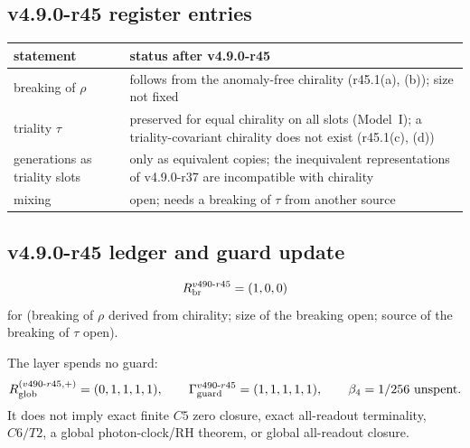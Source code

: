 \subsection*{v4.9.0-r45 register entries}
\label{subsec:v490-r45-register}

\begin{center}
\small
\begin{tabular}{@{}>{\raggedright\arraybackslash}p{}>{\raggedright\arraybackslash}p{}@{}}
\toprule
statement & status after v4.9.0-r45\\
\midrule
breaking of \(\rho\) & follows from the anomaly-free chirality (r45.1(a), (b)); size not fixed\\
triality \(\tau\) & preserved for equal chirality on all slots (Model~I); a triality-covariant chirality does not exist (r45.1(c), (d))\\
generations as triality slots & only as equivalent copies; the inequivalent representations of v4.9.0-r37 are incompatible with chirality\\
mixing & open; needs a breaking of \(\tau\) from another source\\
\bottomrule
\end{tabular}
\end{center}

\subsection*{v4.9.0-r45 ledger and guard update}
\label{subsec:v490-r45-ledger-guard}

\[
R_{\rm br}^{v490\text{-}r45}=(1,0,0)
\]
for (breaking of \(\rho\) derived from chirality; size of the breaking open; source of the breaking of \(\tau\) open).

The layer spends no guard:
\[
R_{\rm glob}^{(v490\text{-}r45,+)}=(0,1,1,1,1),
\qquad
\Gamma_{\rm guard}^{v490\text{-}r45}=(1,1,1,1,1),
\qquad
\beta_4=1/256\ \text{unspent}.
\]
It does not imply exact finite \(C5\) zero closure, exact all-readout terminality,
\(C6/T2\), a global photon-clock/RH theorem, or global all-readout closure.
